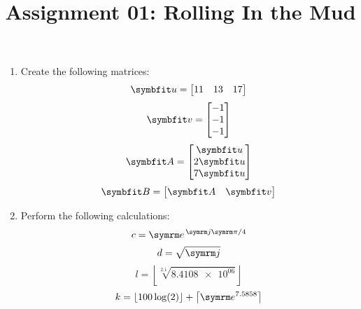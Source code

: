 \documentclass{article}
\title{Assignment 01: Rolling In the Mud}
\begin{document}
\renderTitle

\begin{enumerate}[leftmargin=*]
	\item
		Create the following matrices:
		\begin{equation}
			\mat{u} =
			\begin{bmatrix}
				11 & 13 & 17
			\end{bmatrix}
		\end{equation}
		\begin{equation}
			\mat{v} =
			\begin{bmatrix}
				-1 \\
				-1 \\
				-1 \\
			\end{bmatrix}
		\end{equation}
		\begin{equation}
			\mat{A} =
			\begin{bmatrix}
				\mat{u}  \\
				2\mat{u} \\
				7\mat{u} \\
			\end{bmatrix}
		\end{equation}
		\begin{equation}
			\mat{B} =
			\begin{bmatrix}
				\mat{A} & \mat{v}
			\end{bmatrix}
		\end{equation}

	\item
		Perform the following calculations:
		\begin{equation}
			c = \e^{\,\im\cpi / 4}
		\end{equation}
		\begin{equation}
			d = \sqrt{\im}
		\end{equation}
		\begin{equation}
			l
			=
			\left\lfloor
			\sqrt[2.1]{\num{8.4108e+06}}
			\right\rfloor
		\end{equation}
		\begin{equation}
			k
			=
			\lfloor100\log(2)\rfloor
			+
			\left\lceil\e^{7.5858}\right\rceil
		\end{equation}
\end{enumerate}
\end{document}
